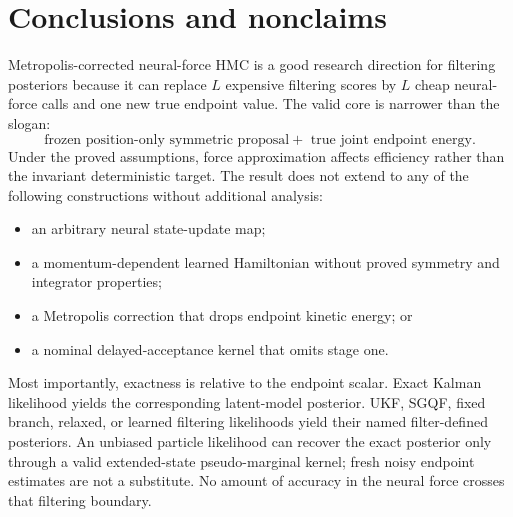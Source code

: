 \section{Conclusions and nonclaims}

Metropolis-corrected neural-force HMC is a good research direction for
filtering posteriors because it can replace $L$ expensive filtering scores by
$L$ cheap neural-force calls and one new true endpoint value.  The valid core
is narrower than the slogan:
\begin{equation}
 \boxed{\text{frozen position-only symmetric proposal}
 +\text{ true joint endpoint energy}.}
\end{equation}
Under the proved assumptions, force approximation affects efficiency rather
than the invariant deterministic target.  The result does not extend to any of
the following constructions without additional analysis:
\begin{itemize}
 \item an arbitrary neural state-update map;
 \item a momentum-dependent learned Hamiltonian without proved symmetry and
 integrator properties;
 \item a Metropolis correction that drops endpoint kinetic energy; or
 \item a nominal delayed-acceptance kernel that omits stage one.
\end{itemize}

Most importantly, exactness is relative to the endpoint scalar.  Exact Kalman
likelihood yields the corresponding latent-model posterior.  UKF, SGQF, fixed
branch, relaxed, or learned filtering likelihoods yield their named
filter-defined posteriors.  An unbiased particle likelihood can recover the
exact posterior only through a valid extended-state pseudo-marginal kernel;
fresh noisy endpoint estimates are not a substitute.  No amount of accuracy in
the neural force crosses that filtering boundary.
